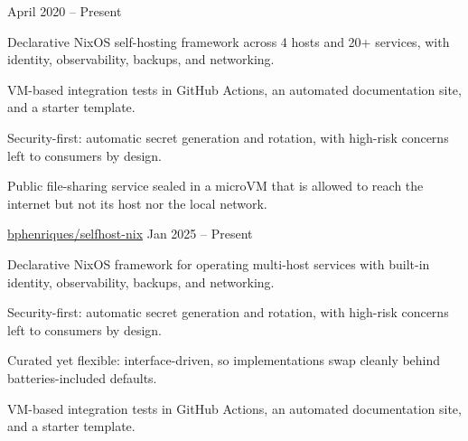 
\begin{cventries}
    {April 2020 – Present}
    {
    \begin{openSourceItems}
        \item Declarative NixOS self-hosting framework across 4 hosts and 20+ services, with identity, observability, backups, and networking.
        \item VM-based integration tests in GitHub Actions, an automated documentation site, and a starter template.
        \item Security-first: automatic secret generation and rotation, with high-risk concerns left to consumers by design.
        \item Public file-sharing service sealed in a microVM that is allowed to reach the internet but not its host nor the local network.
    \end{openSourceItems}
    }

  \iffalse
  \openSourceEntry
    {\href{https://github.com/bphenriques/selfhost-nix}{bphenriques/selfhost-nix}}
    {Jan 2025 – Present}
    {
    \begin{openSourceItems}
        \item Declarative NixOS framework for operating multi-host services with built-in identity, observability, backups, and networking.
        \item Security-first: automatic secret generation and rotation, with high-risk concerns left to consumers by design.
        \item Curated yet flexible: interface-driven, so implementations swap cleanly behind batteries-included defaults.
        \item VM-based integration tests in GitHub Actions, an automated documentation site, and a starter template.
    \end{openSourceItems}
    \vspace{4mm}
    }

  \vspace{2mm}


\end{cventries}
